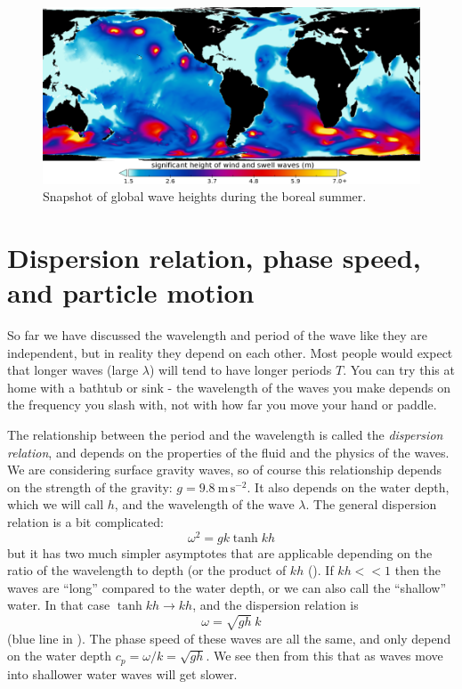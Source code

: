\begin{figure}[hbt]
  \begin{center}
      \includegraphics{figs/Waves/WaveHeightGlobal}
    \caption{Snapshot of global wave heights during the boreal summer.  }
    \label{fig:WaveHeightGlobal}
  \end{center}
\end{figure}

\section{Dispersion relation, phase speed, and particle motion}

So far we have discussed the wavelength and period of the wave like they are independent, but in reality they depend on each other.  Most people would expect that longer waves (large $\lambda$) will tend to have longer periods $T$.  You can try this at home with a bathtub or sink - the wavelength of the waves you make depends on the frequency you slash with, not with how far you move your hand or paddle.  

The relationship between the period and the wavelength is called the \emph{dispersion relation}, and depends on the properties of the fluid and the physics of the waves.  We are considering surface gravity waves, so of course this relationship depends on the strength of the gravity: $g = 9.8\ \mathrm{m\,s^{-2}}$. It also depends on the water depth, which we will call $h$, and the wavelength of the wave $\lambda$.  The general dispersion relation is a bit complicated:
\begin{equation}
  \omega^2  =  g k \tanh kh
\end{equation}
but it has two much simpler asymptotes that are applicable depending on the ratio of the wavelength to depth (or the product of $kh$ ().    If $kh<<1$ then the waves are ``long'' compared to the water depth, or we can also call the ``shallow'' water.  In that case $\tanh kh \to kh$, and the dispersion relation is 
\begin{equation}
    \omega = \sqrt{gh}\ k    
\end{equation}
(blue line in ). The phase speed of these waves are all the same, and only depend on the water depth $c_p = \omega / k = \sqrt{gh}$. We see then from this that as waves move into shallower water waves will get slower.  


